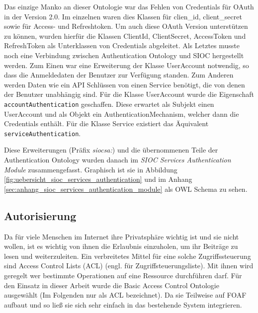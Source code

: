 Das einzige Manko an dieser Ontologie war das Fehlen von Credentials für OAuth in der Version 2.0. Im einzelnen waren dies Klassen für clien\_id, client\_secret sowie für Access- und Refreshtoken. Um auch diese OAuth Version unterstützen zu können, wurden hierfür die Klassen ClientId, ClientSecret, AccessToken und RefreshToken als Unterklassen von Credentials abgeleitet. Als Letztes musste noch eine Verbindung zwischen Authentication Ontology und SIOC hergestellt werden. Zum Einen war eine Erweiterung der Klasse UserAccount notwendig, so dass die Anmeldedaten der Benutzer zur Verfügung standen. Zum Anderen werden Daten wie ein API Schlüssen von einen Service benötigt, die von denen der Benutzer unabhängig sind. Für die Klasse UserAccount wurde die Eigenschaft \texttt{accountAuthentication} geschaffen. Diese erwartet als Subjekt einen UserAccount und als Objekt ein AuthenticationMechanism, welcher dann die Credentials enthält. Für die Klasse Service existiert das Äquivalent \texttt{serviceAuthentication}. 

Diese Erweiterungen (Präfix \emph{siocsa:}) und die übernommenen Teile der Authentication Ontology wurden danach im \emph{SIOC Services Authentication Module} zusammengefasst. Graphisch ist sie in Abbildung \ref{fig:uebersicht_sioc_services_authentication} und im Anhang \ref{sec:anhang_sioc_services_authentication_module} als OWL Schema zu sehen. 


\subsection{Autorisierung} %
\label{sub:autorisierung}

Da für viele Menschen im Internet ihre Privatsphäre wichtig ist und sie nicht wollen, ist es wichtig von ihnen die Erlaubnis einzuholen, um ihr Beiträge zu lesen und weiterzuleiten. Ein verbreitetes Mittel für eine solche Zugriffssteuerung sind Access Control Lists (ACL) (engl. für Zugriffsteuerungsliste). Mit ihnen wird geregelt wer bestimmte Operationen auf eine Ressource durchführen darf. Für den Einsatz in dieser Arbeit wurde die Basic Access Control Ontologie \cite{Hollenbach2009,wiki:wacl} ausgewählt (Im Folgenden nur als ACL bezeichnet). Da sie Teilweise auf FOAF aufbaut und so ließ sie sich sehr einfach in das bestehende System integrieren.

